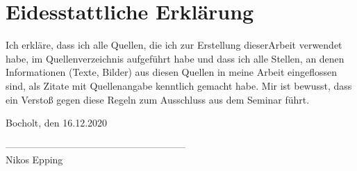 \documentclass[12pt,ngerman,a4paper,parskip]{scrartcl}
\begin{document}



\newpage

\tableofcontents

\newpage















\appendix

\newpage

\newpage

\listoffigures
\listoftables


\newpage
\section*{Eidesstattliche Erklärung}
Ich erkläre, dass ich alle Quellen, die ich zur Erstellung dieserArbeit verwendet habe, im Quellenverzeichnis aufgeführt habe und dass ich alle Stellen, an denen Informationen (Texte, Bilder) aus diesen Quellen in meine Arbeit eingeflossen sind, als Zitate mit Quellenangabe kenntlich gemacht habe.
Mir ist bewusst, dass ein Verstoß gegen diese Regeln zum Ausschluss aus dem Seminar führt.

\vspace{1.5cm}

\small
Bocholt, den 16.12.2020

\vspace{0.8cm}

--------------------------------------------------------\\
Nikos Epping
\end{document}
